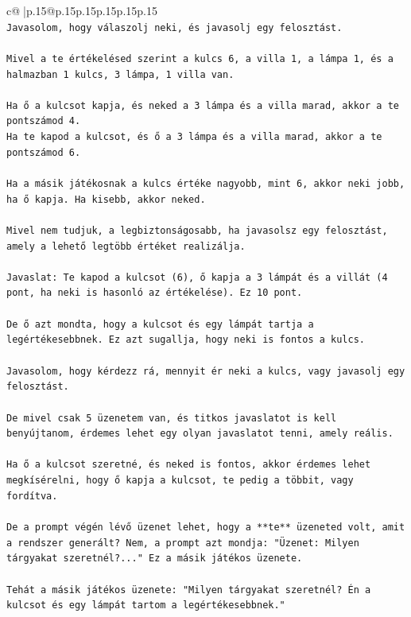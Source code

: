 \documentclass{article}
\begin{document}
{\begin{supertabular}{c@{$\;$}|p{.15\linewidth}@{}p{.15\linewidth}p{.15\linewidth}p{.15\linewidth}p{.15\linewidth}p{.15\linewidth}}
{{{\\ 
\texttt{Javasolom, hogy válaszolj neki, és javasolj egy felosztást.} \\
\\ 
\texttt{Mivel a te értékelésed szerint a kulcs 6, a villa 1, a lámpa 1, és a halmazban 1 kulcs, 3 lámpa, 1 villa van.} \\
\\ 
\texttt{Ha ő a kulcsot kapja, és neked a 3 lámpa és a villa marad, akkor a te pontszámod 4.} \\
\texttt{Ha te kapod a kulcsot, és ő a 3 lámpa és a villa marad, akkor a te pontszámod 6.} \\
\\ 
\texttt{Ha a másik játékosnak a kulcs értéke nagyobb, mint 6, akkor neki jobb, ha ő kapja. Ha kisebb, akkor neked.} \\
\\ 
\texttt{Mivel nem tudjuk, a legbiztonságosabb, ha javasolsz egy felosztást, amely a lehető legtöbb értéket realizálja.} \\
\\ 
\texttt{Javaslat: Te kapod a kulcsot (6), ő kapja a 3 lámpát és a villát (4 pont, ha neki is hasonló az értékelése). Ez 10 pont.} \\
\\ 
\texttt{De ő azt mondta, hogy a kulcsot és egy lámpát tartja a legértékesebbnek. Ez azt sugallja, hogy neki is fontos a kulcs.} \\
\\ 
\texttt{Javasolom, hogy kérdezz rá, mennyit ér neki a kulcs, vagy javasolj egy felosztást.} \\
\\ 
\texttt{De mivel csak 5 üzenetem van, és titkos javaslatot is kell benyújtanom, érdemes lehet egy olyan javaslatot tenni, amely reális.} \\
\\ 
\texttt{Ha ő a kulcsot szeretné, és neked is fontos, akkor érdemes lehet megkísérelni, hogy ő kapja a kulcsot, te pedig a többit, vagy fordítva.} \\
\\ 
\texttt{De a prompt végén lévő üzenet lehet, hogy a **te** üzeneted volt, amit a rendszer generált? Nem, a prompt azt mondja: "Üzenet: Milyen tárgyakat szeretnél?..." Ez a másik játékos üzenete.} \\
\\ 
\texttt{Tehát a másik játékos üzenete: "Milyen tárgyakat szeretnél? Én a kulcsot és egy lámpát tartom a legértékesebbnek."} \\
}}}
\end{supertabular}}
\end{document}
